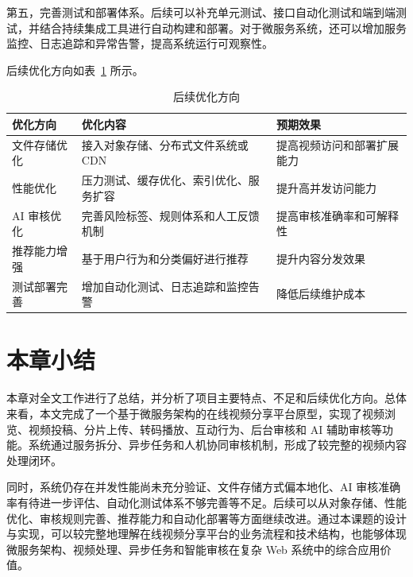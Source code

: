 第五，完善测试和部署体系。后续可以补充单元测试、接口自动化测试和端到端测试，并结合持续集成工具进行自动构建和部署。对于微服务系统，还可以增加服务监控、日志追踪和异常告警，提高系统运行可观察性。

后续优化方向如表~\ref{tab:future-work} 所示。

\begin{table}[htbp]
  \centering
  \caption{后续优化方向}
  \label{tab:future-work}
  \begin{tabular}{p{}p{}p{}}
    \hline
    \textbf{优化方向} & \textbf{优化内容} & \textbf{预期效果} \\
    \hline
    文件存储优化 & 接入对象存储、分布式文件系统或 CDN & 提高视频访问和部署扩展能力 \\
    性能优化 & 压力测试、缓存优化、索引优化、服务扩容 & 提升高并发访问能力 \\
    AI 审核优化 & 完善风险标签、规则体系和人工反馈机制 & 提高审核准确率和可解释性 \\
    推荐能力增强 & 基于用户行为和分类偏好进行推荐 & 提升内容分发效果 \\
    测试部署完善 & 增加自动化测试、日志追踪和监控告警 & 降低后续维护成本 \\
    \hline
  \end{tabular}
\end{table}

\section{本章小结}
\label{sec:chapter7-summary}

本章对全文工作进行了总结，并分析了项目主要特点、不足和后续优化方向。总体来看，本文完成了一个基于微服务架构的在线视频分享平台原型，实现了视频浏览、视频投稿、分片上传、转码播放、互动行为、后台审核和 AI 辅助审核等功能。系统通过服务拆分、异步任务和人机协同审核机制，形成了较完整的视频内容处理闭环。

同时，系统仍存在并发性能尚未充分验证、文件存储方式偏本地化、AI 审核准确率有待进一步评估、自动化测试体系不够完善等不足。后续可以从对象存储、性能优化、审核规则完善、推荐能力和自动化部署等方面继续改进。通过本课题的设计与实现，可以较完整地理解在线视频分享平台的业务流程和技术结构，也能够体现微服务架构、视频处理、异步任务和智能审核在复杂 Web 系统中的综合应用价值。
